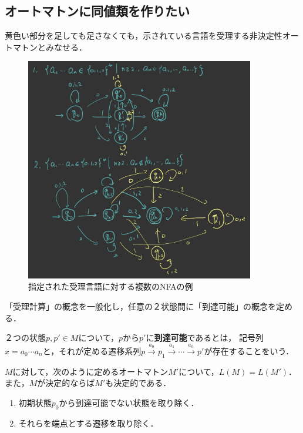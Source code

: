 \documentclass[uplatex, dvipdfmx]{jsreport}
\begin{document}
\subsection{オートマトンに同値類を作りたい}

\begin{example}[非決定性オートマトンは一意に定まらない．]
    黄色い部分を足しても足さなくても，示されている言語を受理する非決定性オートマトンとみなせる．
    \begin{figure}[h]\centering\caption{指定された受理言語に対する複数のNFAの例}
        \includegraphics[width=10cm]{automata-1.jpg}
    \end{figure}
\end{example}

「受理計算」の概念を一般化し，任意の２状態間に「到達可能」の概念を定める．

\begin{definition}[accessible]
    ２つの状態$p,p'\in M$について，$p$から$p'$に\textbf{到達可能}であるとは，
    記号列$x=a_0\cdots a_n$と，それが定める遷移系列$p\xrightarrow{a_0}p_1\xrightarrow{a_1}\cdots\xrightarrow{a_n}p'$が存在することをいう．
\end{definition}

\begin{proposition}
    $M$に対して，次のように定めるオートマトン$M'$について，$L(M)=L(M')$．
    また，$M$が決定的ならば$M'$も決定的である．
    \begin{enumerate}
        \item 初期状態$p_0$から到達可能でない状態を取り除く．
        \item それらを端点とする遷移を取り除く．
    \end{enumerate}
\end{proposition}
\end{document}
